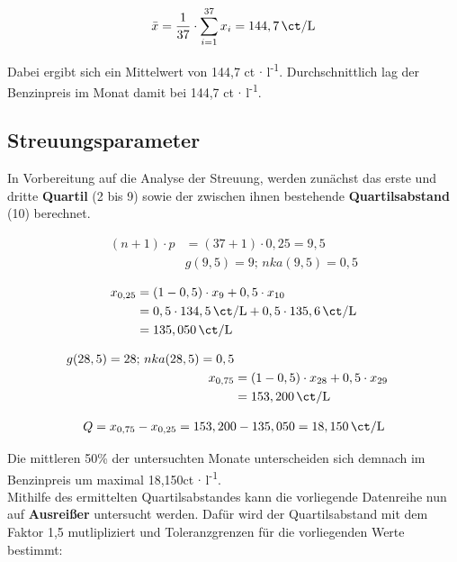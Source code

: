 \begin{equation}
  \bar{x} = \frac{1}{37} \cdot \sum_{i=1}^{37}{x_i} = 144,7 \, \si{\ct\per\liter}
\end{equation}

Dabei ergibt sich ein Mittelwert von 144,7 ct $\cdot$ l\textsuperscript{-1}. Durchschnittlich lag der Benzinpreis im Monat damit bei 144,7 ct $\cdot$ l\textsuperscript{-1}.


\subsection{Streuungsparameter}
In Vorbereitung auf die Analyse der Streuung, werden zunächst das erste und dritte \textbf{Quartil} (2 bis 9) sowie der zwischen ihnen bestehende \textbf{Quartilsabstand} (10) berechnet.

\begin{align}
  (n+1) \cdot p &= (37+1) \cdot 0,25 = 9,5\\
          &g(9,5) = 9; \, nka(9,5) = 0,5
\end{align}

\begin{align}
  x_{0,25} &= (1-0,5) \cdot x_9 + 0,5 \cdot x_{10}\\
        &= 0,5 \cdot 134,5 \, \si{\ct\per\liter} + 0,5 \cdot 135,6 \, \si{\ct\per\liter}\\
        &= 135,050 \, \si{\ct\per\liter}
\end{align}

\begin{align}
  g(28,5) = 28; \, nka(28,5) = 0,5\\
  x_{0,75} &= (1-0,5) \cdot x_{28} + 0,5 \cdot x_{29}\\
        &= 153,200 \, \si{\ct\per\liter}
\end{align}

\begin{align}
 Q = x_{0,75} - x_{0,25} = 153,200 - 135,050 = 18,150 \, \si{\ct\per\liter}
\end{align}


Die mittleren 50\% der untersuchten Monate unterscheiden sich demnach im Benzinpreis um maximal 18,150ct $\cdot$ l\textsuperscript{-1}.\\

Mithilfe des ermittelten Quartilsabstandes kann die vorliegende Datenreihe nun auf \textbf{Ausreißer} untersucht werden. Dafür wird der Quartilsabstand mit dem Faktor 1,5 mutlipliziert und Toleranzgrenzen für die vorliegenden Werte bestimmt:

